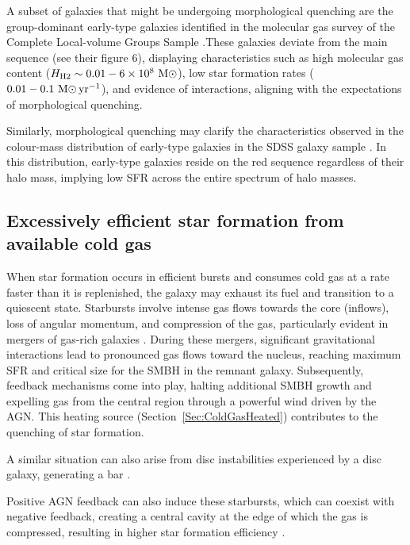 \documentclass[baaa]{baaa}
\begin{document}
A subset of galaxies that might be undergoing morphological quenching are the group-dominant early-type galaxies identified in the molecular gas survey of the Complete Local-volume Groups Sample \citep[CLoGS,][]{Sullivan_2018}.These galaxies deviate from the main sequence (see their figure 6), displaying characteristics such as high molecular gas content ($H_{\rm H2} \sim 0.01 - 6\times 10^8~{\rm M}{\odot}$), low star formation rates ($0.01-0.1~{\rm M}{\odot}\,{\rm yr}^{-1}$), and evidence of interactions, aligning with the expectations of morphological quenching.

Similarly, morphological quenching may clarify the  characteristics observed in the colour-mass distribution of early-type galaxies in the SDSS galaxy sample 
\citep[see their figure 10]{Schawinski_2014}. In this distribution, early-type galaxies reside on the red sequence regardless of their halo mass, implying low SFR across the entire spectrum of halo masses. 

\subsection{Excessively efficient star formation from available cold gas}

When star formation occurs in efficient bursts and consumes cold gas at a rate faster than it is replenished, the galaxy may exhaust its fuel and transition to a quiescent state. Starbursts involve intense gas flows towards the core (inflows), loss of angular momentum, and compression of the gas, 
particularly evident in mergers of gas-rich galaxies \citep[e.g.][]{Springel_2005}. During these mergers, significant gravitational interactions lead to pronounced gas flows toward the nucleus, reaching maximum SFR and critical size for the SMBH in the remnant galaxy. Subsequently, feedback mechanisms come into play, halting additional SMBH growth and expelling gas from the central region through a powerful wind driven by the AGN. This heating source (Section~\ref{Sec:ColdGasHeated}) contributes to the quenching of star formation.

A similar  situation can also arise from disc instabilities experienced by a disc galaxy, generating a bar \citep{Athanassoula_2013, Lopez_2023_baaa}.

Positive AGN feedback can also induce these starbursts, which can coexist with negative feedback, creating a central cavity at the edge of which the gas is compressed, resulting in higher star formation efficiency \cite{Mercedes-Feliz_2023}.
\end{document}
